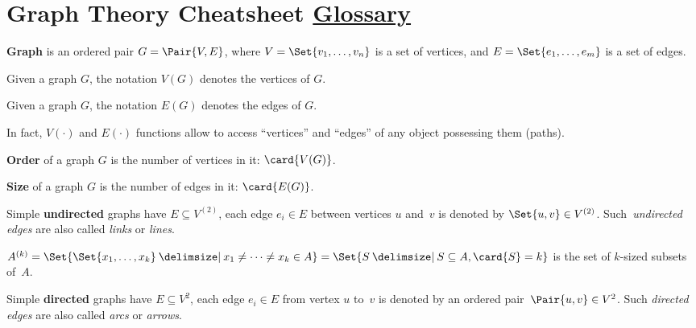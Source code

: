 \documentclass[a4paper,10pt]{article}
\begin{document}

\setcounter{section}{4}
\section{Graph Theory Cheatsheet%
\texorpdfstring{\normalsize\hfill\href{https://en.wikipedia.org/wiki/Glossary_of_graph_theory}{Glossary}}{}}

\begin{terms}
    \item \textbf{Graph} is an ordered pair $G = \Pair{V, E}$, where $V = \Set{v_1,\dotsc,v_n}$ is a set of vertices, and $E = \Set{e_1,\dotsc,e_m}$ is a set of edges.
    \begin{terms}
        \item Given a graph $G$, the notation $V(G)$ denotes the vertices of $G$.
        \item Given a graph $G$, the notation $E(G)$ denotes the edges of $G$.
        \item In fact, $V({\cdot})$ and $E({\cdot})$ functions allow to access \enquote{vertices} and \enquote{edges} of any object possessing them (\eg paths).
    \end{terms}

    \item \textbf{Order} of a graph $G$ is the number of vertices in it: $\card{V(G)}$.
    \item \textbf{Size} of a graph $G$ is the number of edges in it: $\card{E(G)}$.

    \item Simple \textbf{undirected} graphs have $E \subseteq V^{(2)}$, \ie each edge $e_i \in E$ between vertices $u$ and~$v$ is denoted by $\Set{u,v} \in V^{(2)}$.
    Such~\emph{undirected edges} are also called \emph{links} or \emph{lines}.

    \begin{terms}
        \item $A^{(k)} = \Set{\Set{x_1,\dotsc,x_k} \given x_1 \neq \dotsb \neq x_k \in A} = \Set{ S \given S \subseteq A, \card{S} = k }$ is the set of $k$-sized subsets of~$A$.
    \end{terms}

    \item Simple \textbf{directed} graphs have $E \subseteq V^{2}$, \ie each edge $e_i \in E$ from vertex $u$ to~$v$ is denoted by an ordered pair~$\Pair{u,v} \in V^{2}$.
    Such \emph{directed edges} are also called \emph{arcs} or \emph{arrows}.


\end{terms}
\end{document}
